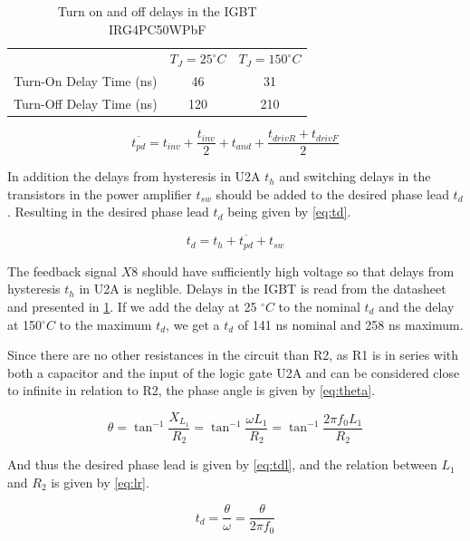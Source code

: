 \begin{table}[H]
    \centering
    \begin{tabular}{c|c|c}
                            & $T_J = 25 ^{\circ}C$ & $T_J = 150 ^{\circ}C$ \\
        Turn-On Delay Time (ns)  & 46                & 31    \\
        Turn-Off Delay Time (ns) & 120               & 210
    \end{tabular}
    \caption{Turn on and off delays in the IGBT IRG4PC50WPbF}
    \label{tab:tigbt}
\end{table}

\begin{equation} \label{eq:tpd}
    \overline{t_{pd}} = t_{inv} + \frac{t_{inv}}{2} + t_{and} + \frac{t_{driv R}+t_{driv F}}{2}
\end{equation}

In addition the delays from hysteresis in U2A $t_h$ and switching delays in the transistors in the power amplifier $t_{sw}$ should be added to the desired phase lead $t_{d}$. Resulting in the desired phase lead $t_{d}$ being given by \cref{eq:td}.

\begin{equation} \label{eq:td}
    t_d = t_{h} + \overline{t_{pd}} + t_{sw}
\end{equation}

The feedback signal $X8$ should have sufficiently high voltage so that delays from hysteresis $t_h$ in U2A is neglible. Delays in the IGBT is read from the datasheet and presented in \cref{tab:tigbt}. If we add the delay at 25 $^{\circ}C$ to the nominal $t_d$ and the delay at 150$^{\circ}C$ to the maximum $t_d$, we get a $t_d$ of 141 ns nominal and 258 ns maximum.

Since there are no other resistances in the circuit than R2, as R1 is in series with both a capacitor and the input of the logic gate U2A and can be considered close to infinite in relation to R2, the phase angle is given by \cref{eq:theta}.

\begin{equation} \label{eq:theta}
    \theta = {\tan}^{-1}\frac{X_{L_1}}{R_2} = {\tan}^{-1}\frac{\omega L_1}{R_2} = {\tan}^{-1}\frac{2 \pi f_0 L_1}{R_2}
\end{equation}

And thus the desired phase lead is given by \cref{eq:tdl}, and the relation between $L_1$ and $R_2$ is given by \cref{eq:lr}.

\begin{equation} \label{eq:tdl}
    t_{d} = \frac{\theta}{\omega} = \frac{\theta}{2 \pi f_0}
\end{equation}

